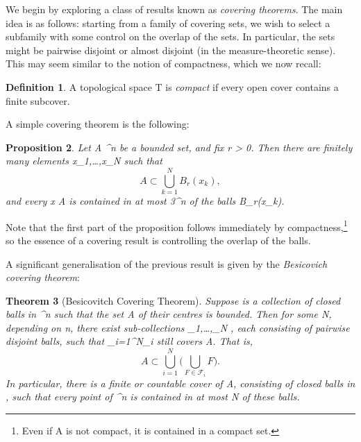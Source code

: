\documentclass[a4paper, 11pt]{article}
\theoremstyle{plain}
\newtheorem{theorem}{Theorem}[section]
\newtheorem{proposition}[theorem]{Proposition}
\theoremstyle{definition}
\newtheorem{definition}[theorem]{Definition}
\theoremstyle{remark}
\numberwithin{equation}{subsection}
\def\({}
\def\){}
\begin{document}
We begin by exploring a class of results known as \emph{covering theorems}. The main idea is as follows: starting from a family of covering sets, we wish to select a subfamily with some control on the overlap of the sets. In particular, the sets might be pairwise disjoint or almost disjoint (in the measure-theoretic sense). This may seem similar to the notion of compactness, which we now recall:

\begin{definition}
A topological space \(T\) is \emph{compact} if every open cover contains a finite subcover.
\end{definition}

A simple covering theorem is the following:

\begin{proposition}
Let \(A \subset {}^{n}\) be a bounded set, and fix \(r > 0\). Then there are finitely many elements \(x_{1},\ldots,x_{N}\) such that
\begin{equation}
A \subset \bigcup_{k=1}^{N}B_{r}(x_{k}),
\end{equation}
and every \(x \in A\) is contained in at most \(3^{n}\) of the balls \(B_{r}(x_{k})\).
\end{proposition}

Note that the first part of the proposition follows immediately by compactness,\footnote{Even if A is not compact, it is contained in a compact set.} so the essence of a covering result is controlling the overlap of the balls.

A significant generalisation of the previous result is given by the \emph{Besicovich covering theorem}:

\begin{theorem}[Besicovitch Covering Theorem]
Suppose \(\) is a collection of closed balls in \(^n\) such that the set \(A\) of their centres is bounded. Then for some \(N\), depending on \(n\), there exist sub-collections \(_1,\ldots,_N \subset {}\), each consisting of pairwise disjoint balls, such that \(\bigcup_{i=1}^{N}_i\) still covers \(A\). That is,
\begin{equation}
A \subset \bigcup_{i=1}^{N}\bigg(\bigcup_{F \in \mathcal{F}_i}F\bigg).
\end{equation}
In particular, there is a finite or countable cover of \(A\), consisting of closed balls in \(\), such that every point of \(^n\) is contained in at most \(N\) of these balls.
\end{theorem}
\end{document}
